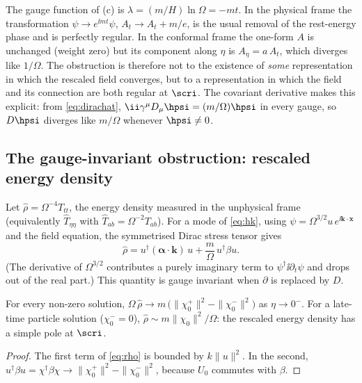 The gauge function of (c) is $\lambda=(m/H)\ln\Omega=-mt$. In the physical frame the transformation $\psi\to e^{\ii mt}\psi$, $A_{t}\to A_{t}+m/e$, is the usual removal of the rest-energy phase and is perfectly regular. In the conformal frame the one-form $A$ is unchanged (weight zero) but its component along $\eta$ is $A_{\eta}=a\,A_{t}$, which diverges like $1/\Omega$. The obstruction is therefore not to the existence of \emph{some} representation in which the rescaled field converges, but to a representation in which the field and its connection are both regular at $\scri$. The covariant derivative makes this explicit: from \eqref{eq:dirachat}, $\ii\gamma^{\mu}D_{\mu}\hpsi=(m/\Omega)\hpsi$ in every gauge, so $D\hpsi$ diverges like $m/\Omega$ whenever $\hpsi\neq0$.

\subsection{The gauge-invariant obstruction: rescaled energy density}
\label{sec:energy}

Let $\hat\rho=\Omega^{-4}T_{tt}$, the energy density measured in the unphysical frame (equivalently $\hat T_{\eta\eta}$ with $\hat T_{ab}=\Omega^{-2}T_{ab}$). For a mode of \eqref{eq:hk}, using $\psi=\Omega^{3/2}u\,e^{\ii\mathbf{k}\cdot\mathbf{x}}$ and the field equation, the symmetrised Dirac stress tensor gives
\begin{equation}
\hat\rho=u^{\dagger}(\boldsymbol\alpha\cdot\mathbf{k})\,u+\frac{m}{\Omega}\,u^{\dagger}\beta u .
\label{eq:rho}
\end{equation}
(The derivative of $\Omega^{3/2}$ contributes a purely imaginary term to $\psi^{\dagger}\ii\partial_{t}\psi$ and drops out of the real part.) This quantity is gauge invariant when $\partial$ is replaced by $D$.

\begin{proposition}
\label{prop:energy}
For every non-zero solution, $\Omega\,\hat\rho\to m\,\big(\|\chi_{0}^{+}\|^{2}-\|\chi_{0}^{-}\|^{2}\big)$ as $\eta\to0^{-}$. For a late-time particle solution ($\chi_{0}^{-}=0$), $\hat\rho\sim m\|\chi_{0}\|^{2}/\Omega$: the rescaled energy density has a simple pole at $\scri$.
\end{proposition}
\begin{proof}
The first term of \eqref{eq:rho} is bounded by $k\|u\|^{2}$. In the second, $u^{\dagger}\beta u=\chi^{\dagger}\beta\chi\to\|\chi_{0}^{+}\|^{2}-\|\chi_{0}^{-}\|^{2}$, because $U_{0}$ commutes with $\beta$.
\end{proof}

